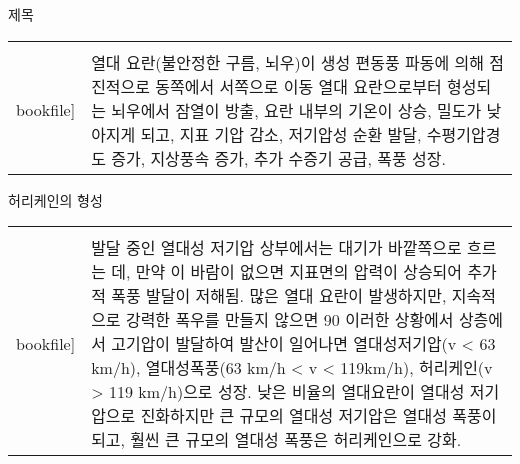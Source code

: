 \begin{frame}[t]{제목}
	\begin{tabular}{ll}
		\begin{minipage}[t]{0.45\textwidth}\scriptsize
			\begin{figure}[t]
				\texttt{[image: \\bookfile]}
			\end{figure}
		\end{minipage}	
		&
		\begin{minipage}[t]{0.5\textwidth} \scriptsize	
			열대 요란(불안정한 구름, 뇌우)이 생성
			편동풍 파동에 의해 점진적으로 동쪽에서 서쪽으로 이동
			열대 요란으로부터 형성되는 뇌우에서 잠열이 방출, 요란 내부의 기온이 상승, 밀도가 낮아지게 되고, 지표 기압 감소, 저기압성 순환 발달, 수평기압경도 증가, 지상풍속 증가, 추가 수증기 공급, 폭풍 성장.
			
			
		\end{minipage}
	\end{tabular}
\end{frame}




\begin{frame}[t]{허리케인의 형성}
	\begin{tabular}{ll}
		\begin{minipage}[t]{0.45\textwidth}\scriptsize
			\begin{figure}[t]
				\texttt{[image: \\bookfile]}
			\end{figure}
		\end{minipage}	
		&
		\begin{minipage}[t]{0.5\textwidth} \scriptsize	
			발달 중인 열대성 저기압 상부에서는 대기가 바깥쪽으로 흐르는 데, 만약 이 바람이 없으면 지표면의 압력이 상승되어 추가적 폭풍 발달이 저해됨.
			많은 열대 요란이 발생하지만, 지속적으로 강력한 폭우를 만들지 않으면 90%
			이러한 상황에서 상층에서 고기압이 발달하여 발산이 일어나면 열대성저기압(v < 63 km/h), 열대성폭풍(63 km/h < v < 119km/h), 허리케인(v > 119 km/h)으로 성장.
			낮은 비율의 열대요란이 열대성 저기압으로 진화하지만 큰 규모의 열대성 저기압은 열대성 폭풍이 되고, 훨씬 큰 규모의 열대성 폭풍은 허리케인으로 강화.
			
			
		\end{minipage}
	\end{tabular}
\end{frame}




